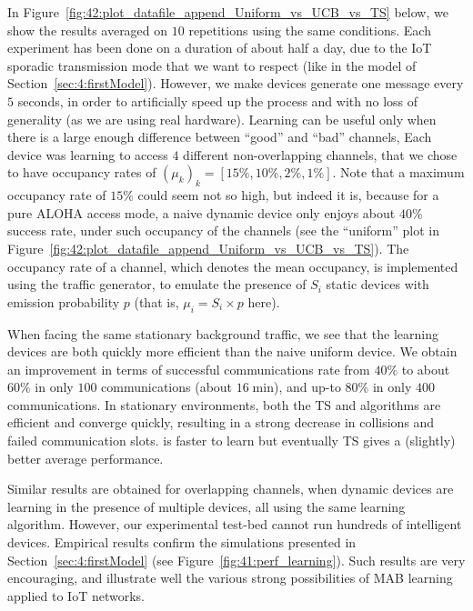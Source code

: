 In Figure~\ref{fig:42:plot_datafile_append_Uniform_vs_UCB_vs_TS} below, we show the results averaged on $10$ repetitions using the same conditions.
%
Each experiment has been done on a duration of about half a day,
due to the IoT sporadic transmission mode that we want to respect (like in the model of Section~\ref{sec:4:firstModel}).
However, we make devices generate one message every $5$ seconds, in order to artificially speed up the process and with no loss of generality (as we are using real hardware).
Learning can be useful only when there is a large enough difference between ``good'' and ``bad'' channels,
Each device was learning to access $4$ different non-overlapping channels, that we chose to have occupancy rates of $(\mu_k)_k = [15\%, 10\%, 2\%, 1\%]$.
Note that a maximum occupancy rate of $15\%$ could seem not so high, but indeed it is, because for a pure ALOHA access mode, a naive dynamic device only enjoys about $40\%$ success rate, under such occupancy of the channels (see the ``uniform'' plot in Figure~\ref{fig:42:plot_datafile_append_Uniform_vs_UCB_vs_TS}).
%
The occupancy rate of a channel, which denotes the mean occupancy, is implemented using the traffic generator, to emulate the presence of $S_i$ static devices with emission probability $p$ (that is, $\mu_i = S_i \times p$ here).

When facing the same stationary background traffic, we see that the learning devices are both quickly more efficient than the naive uniform device.
We obtain an improvement in terms of successful communications rate from $40\%$ to about $60\%$ in only $100$ communications (about $16\;\mathrm{min}$), and up-to $80\%$ in only $400$ communications.
%
In stationary environments, both the TS and \UCB{} algorithms are efficient and converge quickly, resulting in a strong decrease in collisions and failed communication slots. \UCB{} is faster to learn but eventually TS gives a (slightly) better average performance.

Similar results are obtained for overlapping channels, when dynamic devices are learning in the presence of multiple devices, all using the same learning algorithm.
However, our experimental test-bed cannot run hundreds of intelligent devices.
Empirical results confirm the simulations presented in Section~\ref{sec:4:firstModel} (see Figure~\ref{fig:41:perf_learning}).
Such results are very encouraging, and illustrate well the various strong possibilities of MAB learning applied to IoT networks.

